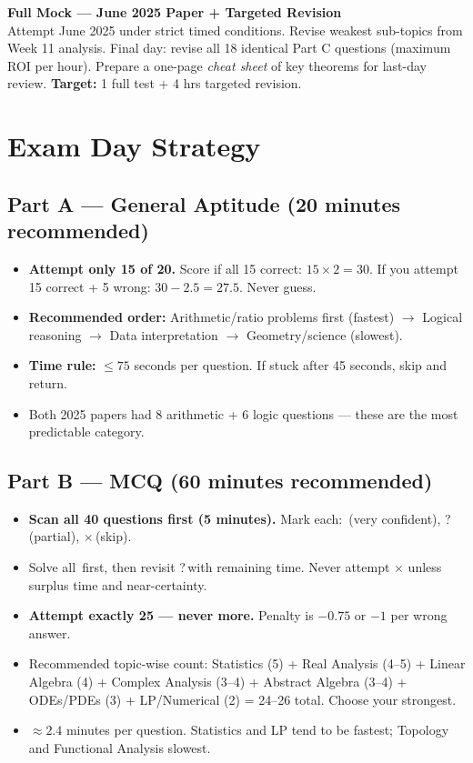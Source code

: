 \documentclass[12pt,a4paper]{article}
\newcommand{\weekblock}[3]{%
  \begin{tcolorbox}[
    enhanced, breakable,
    colback=white, colframe=blueprimary!30,
    boxrule=0.5pt, arc=5pt,
    left=4pt, right=8pt, top=4pt, bottom=4pt,
    overlay={\node[fill=blueprimary, text=white, font=\small\bfseries,
      inner xsep=6pt, inner ysep=4pt, rounded corners=4pt]
      at ([xshift=18pt, yshift=0pt]frame.west) {W#1};}
  ]
  \hspace{20pt}\textbf{#2}\\[3pt]
  \hspace{20pt}\small\color{graydark}#3
  \end{tcolorbox}\vspace{4pt}%
}
\begin{document}
\weekblock{12}{Full Mock — June 2025 Paper + Targeted Revision}{
Attempt June 2025 under strict timed conditions. Revise weakest sub-topics from Week 11 analysis. Final day: revise all 18 identical Part C questions (maximum ROI per hour). Prepare a one-page \textit{cheat sheet} of key theorems for last-day review. \textbf{Target:} 1 full test + 4 hrs targeted revision.
}

\newpage

\section{Exam Day Strategy}

\subsection{Part A — General Aptitude (20 minutes recommended)}

\begin{itemize}[leftmargin=1.5em, itemsep=4pt]
  \item \textbf{Attempt only 15 of 20.} Score if all 15 correct: $15\times2=30$. If you attempt 15 correct + 5 wrong: $30-2.5=27.5$. Never guess.
  \item \textbf{Recommended order:} Arithmetic/ratio problems first (fastest) $\to$ Logical reasoning $\to$ Data interpretation $\to$ Geometry/science (slowest).
  \item \textbf{Time rule:} $\le 75$ seconds per question. If stuck after 45 seconds, skip and return.
  \item Both 2025 papers had 8 arithmetic + 6 logic questions — these are the most predictable category.
\end{itemize}

\subsection{Part B — MCQ (60 minutes recommended)}

\begin{itemize}[leftmargin=1.5em, itemsep=4pt]
  \item \textbf{Scan all 40 questions first (5 minutes).} Mark each: \checkmark\,(very confident), ?\,(partial), $\times$\,(skip).
  \item Solve all \checkmark\,first, then revisit ?\,with remaining time. Never attempt $\times$ unless surplus time and near-certainty.
  \item \textbf{Attempt exactly 25 — never more.} Penalty is $-0.75$ or $-1$ per wrong answer.
  \item Recommended topic-wise count: Statistics (5) + Real Analysis (4--5) + Linear Algebra (4) + Complex Analysis (3--4) + Abstract Algebra (3--4) + ODEs/PDEs (3) + LP/Numerical (2) = 24--26 total. Choose your strongest.
  \item $\approx 2.4$ minutes per question. Statistics and LP tend to be fastest; Topology and Functional Analysis slowest.
\end{itemize}
\end{document}
